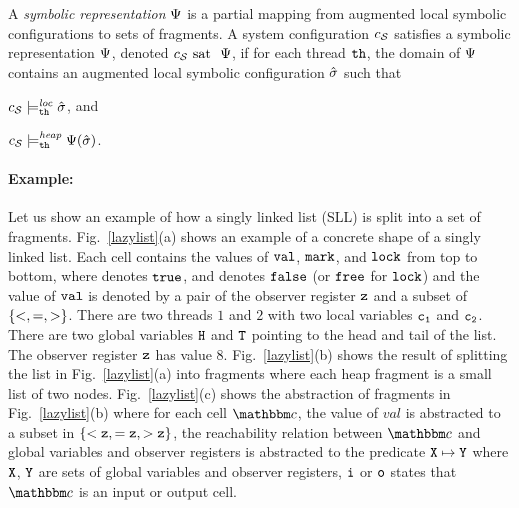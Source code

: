 \begin{definition}
  \label{def:symbrep}
    A {\em symbolic representation} $\Psi$ is a partial mapping from
augmented local symbolic configurations
to sets of fragments.
A system configuration $c_{\mathcal S}$ satisfies a symbolic representation $\Psi$,
denoted $c_{\mathcal S} \mbox{ sat \ } \Psi$,
if for each thread ${\tt th}$, 
the domain of $\Psi$ contains an augmented local symbolic configuration
$\hat{\sigma}$ such that
\begin{inparaenum}[(i)]
\item $c_{\mathcal S} \models_{{\tt th}}^{\mathit{loc}} \hat{\sigma}$, and
\item  $c_{\mathcal S} \models_{{\tt th}}^{\mathit{heap}} \Psi(\hat{\sigma})$.
\end{inparaenum}
\end{definition}




\paragraph{Example:} Let us show an example of how a singly linked list (SLL) is split into a set of fragments. Fig.~\ref{lazylist}(a) shows an example of a concrete shape of a singly linked list. Each cell contains the values of $\tt val$, $\tt mark$, and $\tt lock$ from top to bottom, where \tick \; denotes $\tt true$, and \cross \; denotes $\tt false$ (or $\tt free$ for $\tt lock$) and the value of $\tt val$ is denoted by a pair of the observer register $\tt z$ and a subset of $\left\{<, =, >\right\}$. There are two threads $1$ and $2$ with two local variables $\tt c_1$ and $\tt c_2$. There are two global variables $\tt H$ and $\tt T$ pointing to the head and tail of the list. The observer register $\tt z$ has value 8. Fig.~\ref{lazylist}(b) shows the result of splitting the list in Fig.~\ref{lazylist}(a) into fragments where each heap fragment is a small list of two nodes. Fig.~\ref{lazylist}(c) shows the abstraction of fragments in Fig.~\ref{lazylist}(b) where for each cell $\cell$, the value of $val$ is abstracted to a subset in $\tt \{<z, =z, >z\}$, the reachability relation between $\cell$ and global variables and observer registers is abstracted to the predicate $\tt X \mapsto \tt Y$ where $\tt X$, $\tt Y$ are sets of global variables and observer registers, $\tt i$ or $\tt o$ states that $\cell$ is an input or output cell.


